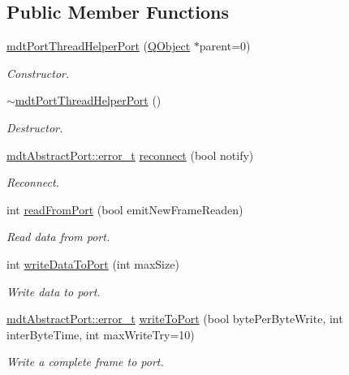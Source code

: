 \subsection*{Public Member Functions}
\begin{DoxyCompactItemize}
\item 
\hyperlink{classmdt_port_thread_helper_port_ab037d6f41e9f19145f06a964701181a3}{mdt\-Port\-Thread\-Helper\-Port} (\hyperlink{class_q_object}{Q\-Object} $\ast$parent=0)
\begin{DoxyCompactList}\small\item\em Constructor. \end{DoxyCompactList}\item 
\hyperlink{classmdt_port_thread_helper_port_afd9117d9a6b4f6769fc3ab0c9fa4a1e8}{$\sim$mdt\-Port\-Thread\-Helper\-Port} ()
\begin{DoxyCompactList}\small\item\em Destructor. \end{DoxyCompactList}\item 
\hyperlink{classmdt_abstract_port_ad4121bb930c95887e77f8bafa065a85e}{mdt\-Abstract\-Port\-::error\-\_\-t} \hyperlink{classmdt_port_thread_helper_port_a0404d78ce7372c4732e48197d4e88e3c}{reconnect} (bool notify)
\begin{DoxyCompactList}\small\item\em Reconnect. \end{DoxyCompactList}\item 
int \hyperlink{classmdt_port_thread_helper_port_a9b908f7675a9f5ab28f306bba282f68f}{read\-From\-Port} (bool emit\-New\-Frame\-Readen)
\begin{DoxyCompactList}\small\item\em Read data from port. \end{DoxyCompactList}\item 
int \hyperlink{classmdt_port_thread_helper_port_a1d5cda8a61575825c3acd8b72f00fc6f}{write\-Data\-To\-Port} (int max\-Size)
\begin{DoxyCompactList}\small\item\em Write data to port. \end{DoxyCompactList}\item 
\hyperlink{classmdt_abstract_port_ad4121bb930c95887e77f8bafa065a85e}{mdt\-Abstract\-Port\-::error\-\_\-t} \hyperlink{classmdt_port_thread_helper_port_a25c35855dc9e8edc489a9efad8d293f7}{write\-To\-Port} (bool byte\-Per\-Byte\-Write, int inter\-Byte\-Time, int max\-Write\-Try=10)
\begin{DoxyCompactList}\small\item\em Write a complete frame to port. \end{DoxyCompactList}\end{DoxyCompactItemize}
